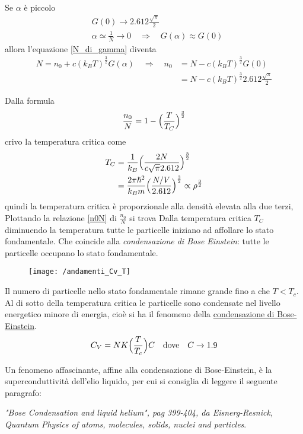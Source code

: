 Se $\alpha$ è piccolo
\begin{equation}
\begin{split}
& G(0) \to 2.612 \frac{\sqrt{\pi}}{2} \\
& \alpha \simeq \frac{1}{N} \to 0 \quad\Rightarrow\quad G(\alpha) \approx G(0)
\end{split}
\end{equation}
allora l'equazione \ref{N_di_gamma} diventa
\begin{equation}
\begin{split}
N = n_0 + c (k_B T)^{ \frac{3}{2} } G(\alpha)
\quad\Rightarrow\quad 
n_0 & = N -  c (k_B T)^{ \frac{3}{2} } G(0) \\
& = N -  c (k_B T)^{ \frac{3}{2} } 2.612 \frac{\sqrt{\pi}}{2}
\end{split}
\end{equation}

Dalla formula 
\begin{equation}
\frac{n_0}{N} = 1 - \Bigl(  \frac{T}{T_C}  \Bigr)^{ \frac{3}{2} } 
\label{n0N}
\end{equation}
crivo la temperatura critica come
\begin{equation}
\begin{split}
T_C & = \frac{1}{k_B} \Bigl(  \frac{2N}{c \sqrt{\pi} 2.612}  \Bigr)^{ \frac{3}{2} } \\
&= \frac{2\pi \hbar^2}{k_B m} \Bigl(  \frac{N/V}{2.612}  \Bigr)^{ \frac{3}{2} } \propto \rho^{ \frac{3}{2} }
\end{split}
\end{equation}
quindi la temperatura critica è proporzionale alla densità elevata alla due terzi,
Plottando la relazione \ref{n0N} di $\frac{n_0}{N}$ si trova 
Dalla temperatura critica $T_C$ diminuendo la temperatura tutte le particelle iniziano ad affollare lo stato fondamentale.
Che coincide alla \emph{condensazione di Bose Einstein}: tutte le particelle occupano lo stato fondamentale.







	\newpage

\begin{figure}[h]
\centering
\texttt{[image: /andamenti\_Cv\_T]}
\end{figure}
Il numero di particelle nello stato fondamentale rimane grande fino a che $T < T_c$.
Al di sotto della temperatura critica le particelle sono condensate nel livello energetico minore di energia, cioè si ha il fenomeno della \underline{condensazione di Bose-Einstein}.
\begin{equation}
C_V = N K \Bigl(  \frac{ T}{T_c }  \Bigr) C \quad \mbox{dove} \quad C \to 1.9
\end{equation} 

Un fenomeno affascinante, affine alla condensazione di Bose-Einstein, è la superconduttività dell'elio liquido, per cui si consiglia di leggere il seguente paragrafo:

\textit{"Bose Condensation and liquid helium", pag 399-404, da Eisnerg-Resnick, Quantum Physics of atoms, molecules, solids, nuclei and particles}.


